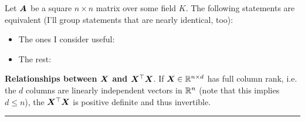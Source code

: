 \documentclass[11pt]{article}
\begin{document}
\begin{definition}
	Let $\bm{A}_{}$ be a square $n \times n$ matrix over some field $K$. The following statements are equivalent (I'll group statements that are nearly identical, too):
	\begin{itemize}
		\item The ones I consider useful:
		
		\item The rest:


	\end{itemize} 
\end{definition}

\textbf{Relationships between $\bm{X}_{}$ and $\bm{X}_{}^\top \bm{X}_{}$}. If $\bm{X}_{} \in \mathbb{R}^{n \times d}$ has full column rank, i.e. the $d$ columns are linearly independent vectors in $\mathbb{R}^n$ (note that this implies $d \leq n$), the $\bm{X}_{}^\top \bm{X}_{}$ is positive definite and thus invertible. 

\vspace{1em}
\rule[0.5ex]{\linewidth}{1pt}
\end{document}
